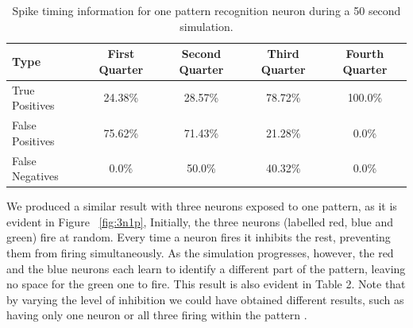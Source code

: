 \documentclass[a4paper,11pt]{article}
\begin{document}
\begin{table}[H]
\centering
\begin{tabular}{lllll}
\hline
\multicolumn{1}{l}{\textbf{Type}} & \multicolumn{1}{c}{\textbf{First Quarter}} & \multicolumn{1}{c}{\textbf{Second Quarter}} & \multicolumn{1}{c}{\textbf{Third Quarter}} & \multicolumn{1}{c}{\textbf{Fourth Quarter}} \\ \hline
\multicolumn{1}{l}{True Positives} & \multicolumn{1}{c}{24.38\%} & \multicolumn{1}{c}{28.57\%} & \multicolumn{1}{c}{78.72\%} & \multicolumn{1}{c}{100.0\%} \\ \hline
\multicolumn{1}{l}{False Positives} & \multicolumn{1}{c}{75.62\%} & \multicolumn{1}{c}{71.43\%} & \multicolumn{1}{c}{21.28\%} & \multicolumn{1}{c}{0.0\%} \\ \hline
\multicolumn{1}{l}{False Negatives} & \multicolumn{1}{c}{0.0\%} & \multicolumn{1}{c}{50.0\%} & \multicolumn{1}{c}{40.32\%} & \multicolumn{1}{c}{0.0\%} \\ \hline
\end{tabular}
\caption{Spike timing information for one pattern recognition neuron during a 50 second simulation.}
\end{table}


We produced a similar result with three neurons exposed to one pattern, as it is evident in Figure ~\ref{fig:3n1p}, Initially, the three neurons (labelled red, blue and green) fire at random. Every time a neuron fires it inhibits the rest, preventing them from firing simultaneously. As the simulation progresses, however, the red and the blue neurons each learn to identify a different part of the pattern, leaving no space for the green one to fire. This result is also evident in Table 2. Note that by varying the level of inhibition we could have obtained different results, such as having only one neuron or all three firing within the pattern \cite{stdp2}.
\end{document}
